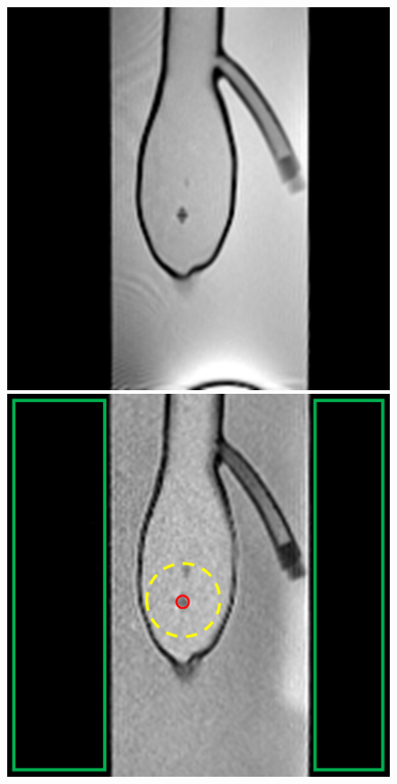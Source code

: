 \documentclass[conference]{IEEEtran}
\begin{document}
\begin{figure}
    \centering
    \begin{minipage}{0.241\textwidth}
        \centering
        \includegraphics[width=\textwidth]{Conference/img/bssfp-CNR_new.png}
    \end{minipage}\hfill \hspace*{0cm}
    \begin{minipage}{0.241\textwidth}
        \centering
        \includegraphics[width=\textwidth]{Conference/img/GRE-CNR_new.png}

\end{minipage}
\end{figure}
\end{document}
